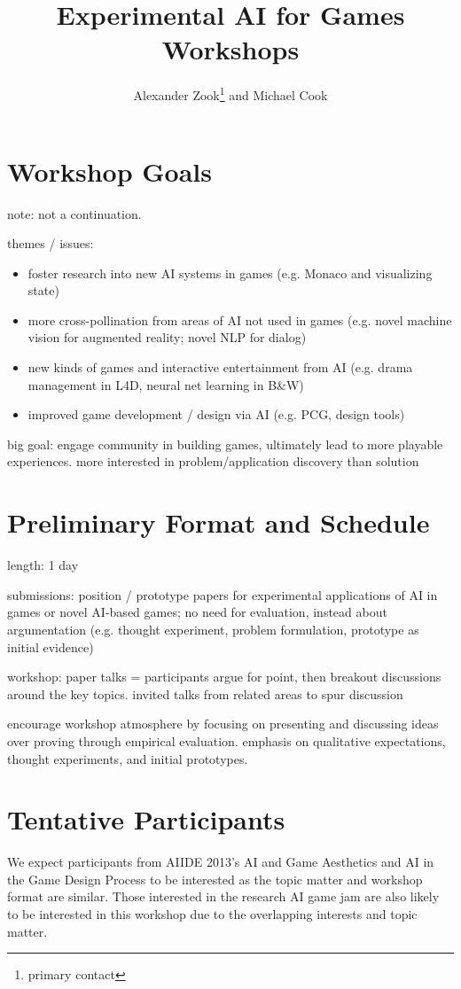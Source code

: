 \documentclass[10pt,a4paper]{article}
\author{Alexander Zook\footnote{primary contact} \hspace{1pt} and Michael Cook}
\title{Experimental AI for Games Workshops}
\begin{document}
\maketitle

\section{Workshop Goals}

note: not a continuation.

themes / issues:
\begin{itemize}
\item foster research into new AI systems in games (e.g. Monaco and visualizing state)
\item more cross-pollination from areas of AI not used in games (e.g. novel machine vision for augmented reality; novel NLP for dialog)
\item new kinds of games and interactive entertainment from AI (e.g. drama management in L4D, neural net learning in B\&W)
\item improved game development / design via AI (e.g. PCG, design tools)
\end{itemize}

big goal: engage community in building games, ultimately lead to more playable experiences. more interested in problem/application discovery than solution



\section{Preliminary Format and Schedule}

length: 1 day

submissions: position / prototype papers for experimental applications of AI in games or novel AI-based games; no need for evaluation, instead about argumentation (e.g. thought experiment, problem formulation, prototype as initial evidence)

workshop: paper talks = participants argue for point, then breakout discussions around the key topics.
invited talks from related areas to spur discussion

encourage workshop atmosphere by focusing on presenting and discussing ideas over proving through empirical evaluation. emphasis on qualitative expectations, thought experiments, and initial prototypes.




\section{Tentative Participants}
We expect participants from AIIDE 2013's AI and Game Aesthetics and AI in the Game Design Process to be interested as the topic matter and workshop format are similar.
Those interested in the research AI game jam are also likely to be interested in this workshop due to the overlapping interests and topic matter.
\end{document}
